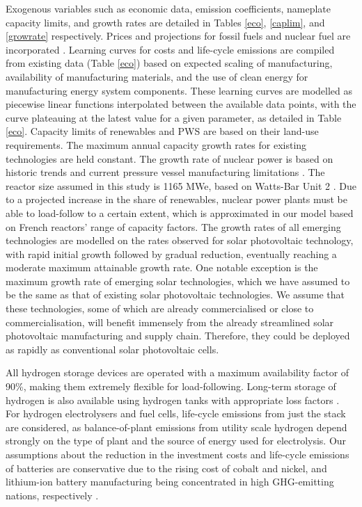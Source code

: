 Exogenous variables such as economic data, emission coefficients, nameplate capacity limits, and growth rates are detailed in Tables \ref{eco}, \ref{caplim}, and \ref{growrate} respectively. Prices and projections for fossil fuels and nuclear fuel are incorporated \cite{wittenstein_projected_2015, world_bank_commodity_2016, international_energy_agency_world_2019}. Learning curves for costs and life-cycle emissions are compiled from existing data (Table \ref{eco}) based on expected scaling of manufacturing, availability of manufacturing materials, and the use of clean energy for manufacturing energy system components. These learning curves are modelled as piecewise linear functions interpolated between the available data points, with the curve plateauing at the latest value for a given parameter, as detailed in Table \ref{eco}. Capacity limits of renewables and \gls{PWS} are based on their land-use requirements. The maximum annual capacity growth rates for existing technologies are held constant. The growth rate of nuclear power is based on historic trends and current pressure vessel manufacturing limitations \cite{iaea_pris_nodate}. The reactor size assumed in this study is 1165 MWe, based on Watts-Bar Unit 2 \cite{iaea_pris_nodate-1}. Due to a projected increase in the share of renewables, nuclear power plants must be able to load-follow to a certain extent, which is approximated in our model based on French reactors' range of capacity factors. The growth rates of all emerging technologies are modelled on the rates observed for solar photovoltaic technology, with rapid initial growth followed by gradual reduction, eventually reaching a moderate maximum attainable growth rate. One notable exception is the maximum growth rate of emerging solar technologies, which we have assumed to be the same as that of existing solar photovoltaic technologies. We assume that these technologies, some of which are already commercialised or close to commercialisation, will benefit immensely from the already streamlined solar photovoltaic manufacturing and supply chain. Therefore, they could be deployed as rapidly as conventional solar photovoltaic cells. 

All hydrogen storage devices are operated with a maximum availability factor of 90\%, making them extremely flexible for load-following. Long-term storage of hydrogen is also available using hydrogen tanks with appropriate loss factors \cite{iea_technology_2015}. For hydrogen electrolysers and fuel cells, life-cycle emissions from just the stack are considered, as balance-of-plant emissions from utility scale hydrogen depend strongly on the type of plant and the source of energy used for electrolysis. Our assumptions about the reduction in the investment costs and life-cycle emissions of batteries are conservative due to the rising cost of cobalt and nickel, and lithium-ion battery manufacturing being concentrated in high \gls{GHG}-emitting nations, respectively \cite{oliveira_environmental_2015,emilsson_lithium-ion_2019,turcheniuk_ten_2018,simon_potential_2015}. 




